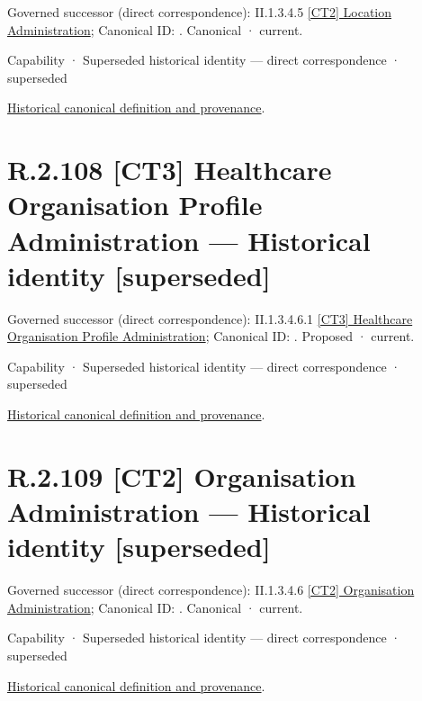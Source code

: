 {\small Governed successor (direct correspondence): II.1.3.4.5 \hyperref[element:c410005667444f99a221483bf577fad2]{[CT2] Location Administration}; Canonical ID: \texttt{}. Canonical · current.}\par
\label{element:d412aff3a5c64e6aaba910d4c2c9356d}
{\small Capability · Superseded historical identity — direct correspondence · superseded}\par
\href{../../../../continuum/strategy/capability/d412aff3a5c64e6aaba910d4c2c9356d.md}{Historical canonical definition and provenance}.\par
\section*{R.2.108 [CT3] Healthcare Organisation Profile Administration — Historical identity [superseded]}
\label{navigation:R.2.108}

{\small Governed successor (direct correspondence): II.1.3.4.6.1 \hyperref[element:f2de9e9394b849f2943355c7a2882a15]{[CT3] Healthcare Organisation Profile Administration}; Canonical ID: \texttt{}. Proposed · current.}\par
\label{element:e485424b799c42aca7399d341ca02d0b}
{\small Capability · Superseded historical identity — direct correspondence · superseded}\par
\href{../../../../continuum/strategy/capability/e485424b799c42aca7399d341ca02d0b.md}{Historical canonical definition and provenance}.\par
\section*{R.2.109 [CT2] Organisation Administration — Historical identity [superseded]}
\label{navigation:R.2.109}

{\small Governed successor (direct correspondence): II.1.3.4.6 \hyperref[element:14fbdc5ce3dd4c2092c5397dab3ed743]{[CT2] Organisation Administration}; Canonical ID: \texttt{}. Canonical · current.}\par
\label{element:1b0eacfbb27d4631a24f9279dab6681d}
{\small Capability · Superseded historical identity — direct correspondence · superseded}\par
\href{../../../../continuum/strategy/capability/1b0eacfbb27d4631a24f9279dab6681d.md}{Historical canonical definition and provenance}.\par
